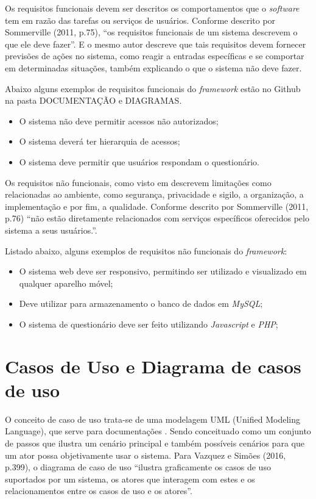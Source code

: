\documentclass[
	12pt,				%
	openright,			%
	oneside,			%
	a4paper,			%
	english,			%
	french,				%
	spanish,			%
	brazil,				%
	]{abntex2}
\begin{document}
Os requisitos funcionais devem ser descritos os comportamentos que o \textit{software} tem em razão das tarefas ou serviços de usuários. Conforme descrito por Sommerville (2011, p.75), “os requisitos funcionais de um sistema descrevem o que ele deve fazer”. E o mesmo autor descreve que tais requisitos devem fornecer previsões de ações no sistema, como reagir a entradas específicas e se comportar em determinadas situações, também explicando o que o sistema não deve fazer.

Abaixo alguns exemplos de requisitos funcionais do \textit{framework} estão no Github na pasta DOCUMENTAÇÃO e DIAGRAMAS.
\begin{itemize}
\item O sistema não deve permitir acessos não autorizados;
\item O sistema deverá ter hierarquia de acessos;
\item O sistema deve permitir que usuários respondam o questionário.
\end{itemize}

Os requisitos não funcionais, como visto em  descrevem limitações como relacionadas ao ambiente, como segurança, privacidade e sigilo, a organização, a implementação e por fim, a qualidade. Conforme descrito por Sommerville (2011, p.76) “não estão diretamente relacionados com serviços específicos oferecidos pelo sistema a seus usuários.”. 

Listado abaixo, alguns exemplos de requisitos não funcionais do \textit{framework}:

\begin{itemize}
\item O sistema web deve ser responsivo, permitindo ser utilizado e visualizado em qualquer aparelho móvel;
\item Deve utilizar para armazenamento o banco de dados em \textit{MySQL};
\item O sistema de questionário deve ser feito utilizando \textit{Javascript} e \textit{PHP};
\end{itemize}

\section{Casos de Uso e Diagrama de casos de uso}

O conceito de caso de uso trata-se de uma modelagem UML (Unified Modeling Language), que serve para documentações  \cite{Sommerville2011}. Sendo conceituado como um conjunto de passos que ilustra um cenário principal e também possíveis cenários para que um ator possa objetivamente usar o sistema. Para Vazquez e Simões (2016, p.399), o diagrama de caso de uso “ilustra graficamente os casos de uso suportados por um sistema, os atores que interagem com estes e os relacionamentos entre os casos de uso e os atores”.
\end{document}
